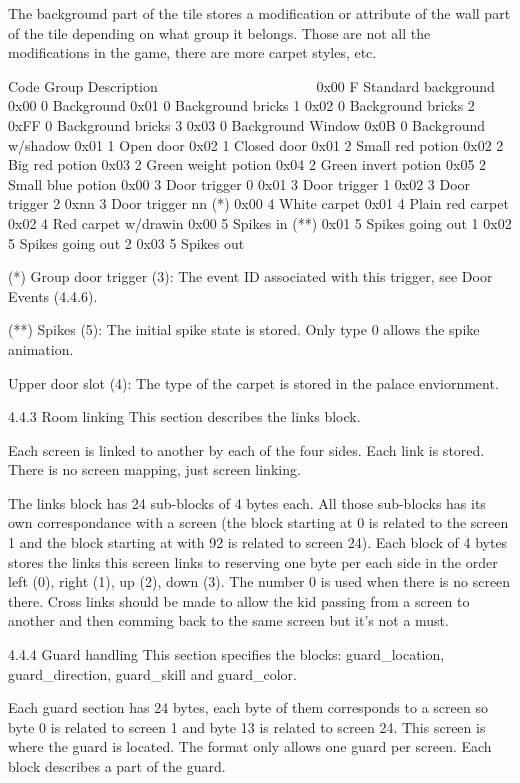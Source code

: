  The background part of the tile stores a modification or attribute of the
 wall part of the tile depending on what group it belongs. Those are not
 all the modifications in the game, there are more carpet styles, etc.

  Code Group Description
  ~~~~ ~~~~~ ~~~~~~~~~~~
  0x00 F     Standard background
  0x00 0     Background
  0x01 0     Background bricks 1
  0x02 0     Background bricks 2
  0xFF 0     Background bricks 3
  0x03 0     Background Window
  0x0B 0     Background w/shadow
  0x01 1     Open door
  0x02 1     Closed door
  0x01 2     Small red potion
  0x02 2     Big red potion
  0x03 2     Green weight potion
  0x04 2     Green invert potion
  0x05 2     Small blue potion
  0x00 3     Door trigger 0
  0x01 3     Door trigger 1
  0x02 3     Door trigger 2
  0xnn 3     Door trigger nn (*)
  0x00 4     White carpet
  0x01 4     Plain red carpet
  0x02 4     Red carpet w/drawin
  0x00 5     Spikes in (**)
  0x01 5     Spikes going out 1
  0x02 5     Spikes going out 2 
  0x03 5     Spikes out

 (*) Group door trigger (3):
 The event ID associated with this trigger, see Door Events (4.4.6).

 (**) Spikes (5):
 The initial spike state is stored. Only type 0 allows the spike animation.

 Upper door slot (4):
 The type of the carpet is stored in the palace enviornment.

4.4.3 Room linking
 This section describes the links block.

 Each screen is linked to another by each of the four sides. Each link
 is stored. There is no screen mapping, just screen linking.

 The links block has 24 sub-blocks of 4 bytes each. All those sub-blocks
 has its own correspondance with a screen (the block starting at 0 is
 related to the screen 1 and the block starting at with 92 is related to
 screen 24).
 Each block of 4 bytes stores the links this screen links to reserving one
 byte per each side in the order left (0), right (1), up (2), down (3).
 The number 0 is used when there is no screen there.
 Cross links should be made to allow the kid passing from a screen to
 another and then comming back to the same screen but it's not a must.

4.4.4 Guard handling
 This section specifies the blocks: guard_location, guard_direction,
 guard_skill and guard_color.

 Each guard section has 24 bytes, each byte of them corresponds to a screen
 so byte 0 is related to screen 1 and byte 13 is related to screen 24.
 This screen is where the guard is located. The format only allows one
 guard per screen. Each block describes a part of the guard.


